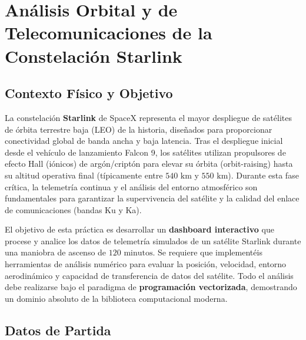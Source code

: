 \section{Análisis Orbital y de Telecomunicaciones de la Constelación Starlink}

	\subsection*{Contexto Físico y Objetivo}
	
	La constelación \textbf{Starlink} de SpaceX representa el mayor despliegue de satélites de órbita terrestre baja (LEO) de la historia, diseñados para proporcionar conectividad global de banda ancha y baja latencia. Tras el despliegue inicial desde el vehículo de lanzamiento Falcon 9, los satélites utilizan propulsores de efecto Hall (iónicos) de argón/criptón para elevar su órbita (orbit-raising) hasta su altitud operativa final (típicamente entre $540\text{ km}$ y $550\text{ km}$). Durante esta fase crítica, la telemetría continua y el análisis del entorno atmosférico son fundamentales para garantizar la supervivencia del satélite y la calidad del enlace de comunicaciones (bandas Ku y Ka).
	
	El objetivo de esta práctica es desarrollar un \textbf{dashboard interactivo} que procese y analice los datos de telemetría simulados de un satélite Starlink durante una maniobra de ascenso de $120\text{ minutos}$. Se requiere que implementéis herramientas de análisis numérico para evaluar la posición, velocidad, entorno aerodinámico y capacidad de transferencia de datos del satélite. Todo el análisis debe realizarse bajo el paradigma de \textbf{programación vectorizada}, demostrando un dominio absoluto de la biblioteca computacional moderna.
	
	\subsection*{Datos de Partida}
	
